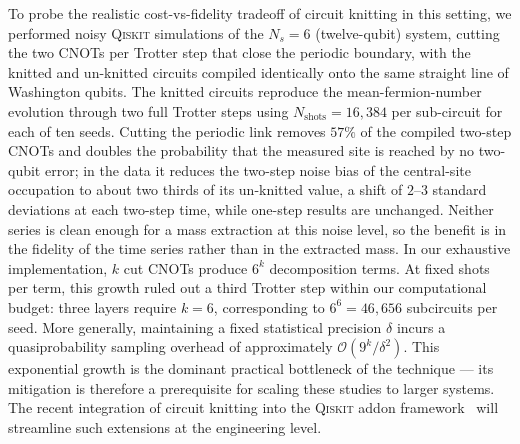 \documentclass[twocolumn,superscriptaddress,showpacs,nofootinbib,notitlepage,preprintnumbers,secnumarabic,amssymb, floatfix, nobibnotes, aps, prd]{revtex4-2}
\begin{document}
To probe the realistic cost-vs-fidelity tradeoff of circuit knitting in
this setting, we performed noisy \textsc{Qiskit} simulations of the
$N_s=6$ (twelve-qubit) system, cutting the two CNOTs per Trotter step that
close the periodic boundary, with the knitted and un-knitted circuits
compiled identically onto the same straight line of Washington qubits.  The
knitted circuits reproduce the mean-fermion-number evolution through two
full Trotter steps using $N_{\mathrm{shots}}=16{,}384$ per sub-circuit for
each of ten seeds.  Cutting the periodic link removes $57\%$ of the compiled
two-step CNOTs and doubles the probability that the measured site is reached
by no two-qubit error; in the data it reduces the two-step noise bias of the
central-site occupation to about two thirds of its un-knitted value, a shift
of $2$--$3$ standard deviations at each two-step time, while one-step results
are unchanged.  Neither series is clean enough for a mass extraction at this
noise level, so the benefit is in the fidelity of the time series rather than
in the extracted mass.  In our exhaustive implementation,
$k$ cut CNOTs produce $6^k$ decomposition terms.  At fixed shots per term,
this growth ruled out a third Trotter step within our computational budget:
three layers require $k=6$, corresponding to $6^6=46{,}656$ subcircuits per
seed.  More generally, maintaining a fixed statistical precision $\delta$
incurs a quasiprobability sampling overhead of approximately
$\mathcal{O}(9^k/\delta^2)$.  This exponential growth is the dominant practical
bottleneck of the technique --- its mitigation is therefore a
prerequisite for scaling these studies to larger systems.  The recent
integration of circuit knitting into the \textsc{Qiskit} addon
framework~\cite{qiskit-addon-cutting} will streamline such extensions
at the engineering level.
\end{document}
